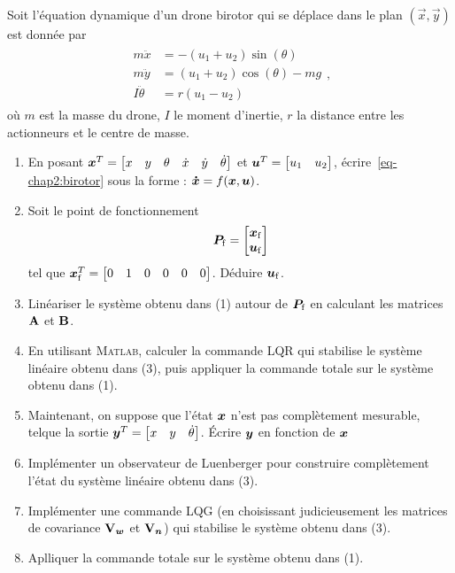 \begin{tpe}
	Soit l'équation dynamique d'un drone birotor qui se déplace dans le plan $(\overset{\rightarrow}{x},\overset{\rightarrow}{y})$ est donnée par 
	\begin{align}\label{eq-chap2:birotor}
		\begin{split}
			m\ddot{x} &= -(u_1+u_2)\sin(\theta)\\
			m\ddot{y} &= (u_1+u_2)\cos(\theta)-mg\\
			I\ddot{\theta} &=r(u_1-u_2)
		\end{split},
	\end{align}
	où $m$ est la masse du drone, $I$ le moment d'inertie, $r$ la distance entre les actionneurs et le centre de masse. 
	\begin{enumerate}
		\item En posant $\bm{x}^T=\begin{bmatrix}
			x&y&\theta&\dot{x}&\dot{y}&\dot{\theta}
		\end{bmatrix}$ et $\bm{u}^T = \begin{bmatrix}
		u_1& u_2
		\end{bmatrix}$, écrire~\eqref{eq-chap2:birotor} sous la forme : $\bm{\dot{x}} = f(\bm{x},\bm{u})$.
		\item Soit le point de fonctionnement
		\begin{equation}
			\bm{P}_{\rm f} = \begin{bmatrix}
				\bm{x}_{\rm f} \\ \bm{u}_{\rm f}
			\end{bmatrix}
		\end{equation} 
		tel que $\bm{x}_{\rm f}^T = \begin{bmatrix}
			0&1&0&0&0&0
		\end{bmatrix}$. Déduire $\bm{u}_{\rm f}$. 
		\item Linéariser le système obtenu dans (1) autour de $\bm{P}_{\rm f}$ en calculant les matrices $\mathbf{A}$ et $\mathbf{B}$.
		\item En utilisant \textsc{Matlab}, calculer la commande LQR qui stabilise le système linéaire obtenu dans (3), puis appliquer la commande totale sur le système obtenu dans (1).
		\item Maintenant, on suppose que l'état $\bm{x}$ n'est pas complètement mesurable, telque la sortie $\bm{y}^T = \begin{bmatrix}
			x&y&\dot{\theta}
		\end{bmatrix} $. Écrire $\bm{y}$ en fonction de $\bm{x}$
		\item Implémenter un observateur de Luenberger pour construire complètement l'état du système linéaire obtenu dans (3).
		\item Implémenter une commande LQG (en choisissant judicieusement les matrices de covariance $\mathbf{V}_{\bm w}$ et $\mathbf{V}_{\bm n}$) qui stabilise le système obtenu dans (3). 
		\item Aplliquer la commande totale sur le système obtenu dans (1).
	\end{enumerate}
\end{tpe}
